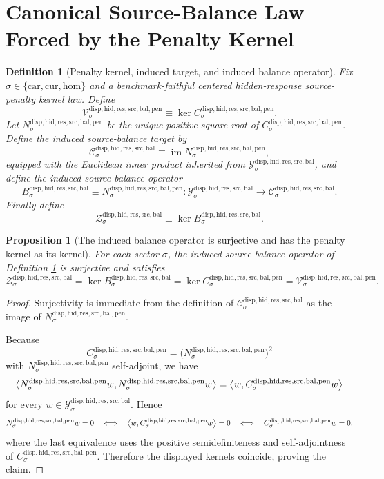 \documentclass[11pt]{article}
\newcommand{\Car}{\mathrm{car}}
\newcommand{\Cur}{\mathrm{cur}}
\newcommand{\Hom}{\mathrm{hom}}
\newcommand{\BalancedSourceCarrier}[1]{\mathcal Y_{#1}^{\mathrm{disp,hid,res,src,bal}}}
\newcommand{\SourceBalanceTarget}[1]{\mathcal C_{#1}^{\mathrm{disp,hid,res,src,bal}}}
\newcommand{\SourceBalanceOperator}[1]{B_{#1}^{\mathrm{disp,hid,res,src,bal}}}
\newcommand{\SourceBalancedState}[1]{\mathcal Z_{#1}^{\mathrm{disp,hid,res,src,bal}}}
\newcommand{\SourcePenaltyOperator}[1]{C_{#1}^{\mathrm{disp,hid,res,src,bal,pen}}}
\newcommand{\SourcePenaltySquareRoot}[1]{N_{#1}^{\mathrm{disp,hid,res,src,bal,pen}}}
\newcommand{\SourcePenaltyKernel}[1]{\mathcal V_{#1}^{\mathrm{disp,hid,res,src,bal,pen}}}
\newtheorem{definition}{Definition}
\newtheorem{proposition}{Proposition}
\begin{document}
\section{Canonical Source-Balance Law Forced by the Penalty Kernel}

\begin{definition}[Penalty kernel, induced target, and induced balance operator]
\label{def:induced}
Fix \(\sigma\in\{\Car,\Cur,\Hom\}\) and a benchmark-faithful centered hidden-response source-penalty kernel law. Define
\[
\SourcePenaltyKernel{\sigma}
\equiv
\ker \SourcePenaltyOperator{\sigma}.
\]
Let \(\SourcePenaltySquareRoot{\sigma}\) be the unique positive square root of \(\SourcePenaltyOperator{\sigma}\). Define the induced source-balance target by
\[
\SourceBalanceTarget{\sigma}
\equiv
\operatorname{im}\SourcePenaltySquareRoot{\sigma},
\]
equipped with the Euclidean inner product inherited from \(\BalancedSourceCarrier{\sigma}\), and define the induced source-balance operator
\[
\SourceBalanceOperator{\sigma}
\equiv
\SourcePenaltySquareRoot{\sigma}
:
\BalancedSourceCarrier{\sigma}\to\SourceBalanceTarget{\sigma}.
\]
Finally define
\[
\SourceBalancedState{\sigma}
\equiv
\ker \SourceBalanceOperator{\sigma}.
\]
\end{definition}

\begin{proposition}[The induced balance operator is surjective and has the penalty kernel as its kernel]
\label{prop:kernel}
For each sector \(\sigma\), the induced source-balance operator of Definition \ref{def:induced} is surjective and satisfies
\[
\SourceBalancedState{\sigma}
=
\ker \SourceBalanceOperator{\sigma}
=
\ker \SourcePenaltyOperator{\sigma}
=
\SourcePenaltyKernel{\sigma}.
\]
\end{proposition}

\begin{proof}
Surjectivity is immediate from the definition of \(\SourceBalanceTarget{\sigma}\) as the image of \(\SourcePenaltySquareRoot{\sigma}\).

Because
\[
\SourcePenaltyOperator{\sigma}
=
\bigl(\SourcePenaltySquareRoot{\sigma}\bigr)^{2}
\]
with \(\SourcePenaltySquareRoot{\sigma}\) self-adjoint, we have
\[
\ev{
\SourcePenaltySquareRoot{\sigma}w,
\SourcePenaltySquareRoot{\sigma}w
}
=
\ev{
w,
\SourcePenaltyOperator{\sigma}w
}
\]
for every \(w\in\BalancedSourceCarrier{\sigma}\). Hence
\[
\SourcePenaltySquareRoot{\sigma}w=0
\quad\Longleftrightarrow\quad
\ev{w,\SourcePenaltyOperator{\sigma}w}=0
\quad\Longleftrightarrow\quad
\SourcePenaltyOperator{\sigma}w=0,
\]
where the last equivalence uses the positive semidefiniteness and self-adjointness of \(\SourcePenaltyOperator{\sigma}\). Therefore the displayed kernels coincide, proving the claim.
\end{proof}
\end{document}

